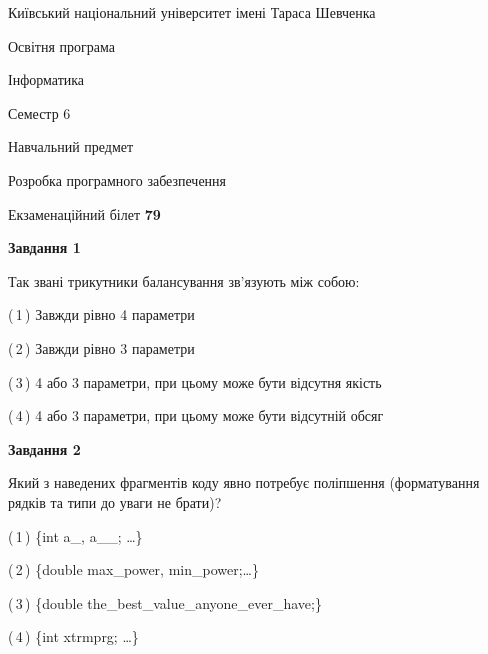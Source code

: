 \documentclass[10pt, ukrainian]{article}
\begin{document}
{{\begin {small}\par
{ \center  Київський національний університет імені Тараса Шевченка \par}
{\parbox {5 cm}{Освітня програма \hfill}{\parbox {7 cm}{Інформатика \hfill}}\parbox {6 cm}{\hfill Семестр 6}}\par
{\parbox {5 cm} {Навчальний предмет \hfill}\parbox {7 cm}{Розробка програмного забезпечення \hfill}\parbox {6cm}{\hfill}\par}\vspace{-7pt} \end{small}}{\center Екзаменаційний білет \No \textbf
{ 79 }\par}}
{
\begin {large}
{\begin {center}\textbf{Завдання 1}\end {center}}\par
Так звані трикутники балансування зв'язують між собою:\par
\vspace{2mm}



(\,1\,) Завжди рівно 4 параметри%



(\,2\,) Завжди рівно 3 параметри%



(\,3\,) 4 або 3 параметри, при цьому може бути відсутня якість%



(\,4\,) 4 або 3 параметри, при цьому може бути відсутній обсяг %


{\begin {center}\textbf{Завдання 2}\end {center}}\par
Який з наведених фрагментів коду явно потребує поліпшення (форматування рядків та типи до уваги не брати)?\par
\vspace{2mm}



(\,1\,) \{int a\_, a\_\_; …\}%



(\,2\,) \{double max\_power, min\_power;…\} %



(\,3\,) \{double the\_best\_value\_anyone\_ever\_have;\} %



(\,4\,) \{int xtrmprg; …\}%



\end{large}}
\end{document}
